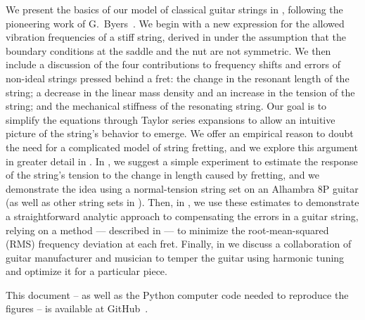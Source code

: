 We present the basics of our model of classical guitar strings in , following the pioneering work of G.\ Byers~\cite{ref:byers1996cgi,ref:byersweb}. We begin with a new expression for the allowed vibration frequencies of a stiff string, derived in  under the assumption that the boundary conditions at the saddle and the nut are not symmetric. We then include a discussion of the four contributions to frequency shifts and errors of non-ideal strings pressed behind a fret: the change in the resonant length of the string; a decrease in the linear mass density and an increase in the tension of the string; and the mechanical stiffness of the resonating string. Our goal is to simplify the equations through Taylor series expansions to allow an intuitive picture of the string's behavior to emerge. We offer an empirical reason to doubt the need for a complicated model of string fretting, and we explore this argument in greater detail in . In , we suggest a simple experiment to estimate the response of the string's tension to the change in length caused by fretting, and we demonstrate the idea using a normal-tension string set on an Alhambra 8P guitar (as well as other string sets in ). Then, in , we use these estimates to demonstrate a straightforward analytic approach to compensating the errors in a guitar string, relying on a method --- described in  --- to minimize the root-mean-squared (RMS) frequency deviation at each fret. Finally, in  we discuss a collaboration of guitar manufacturer and musician to temper the guitar using harmonic tuning and optimize it for a particular piece.

This document -- as well as the Python computer code needed to reproduce the figures -- is available at GitHub~\cite{ref:github2021rgb}. 